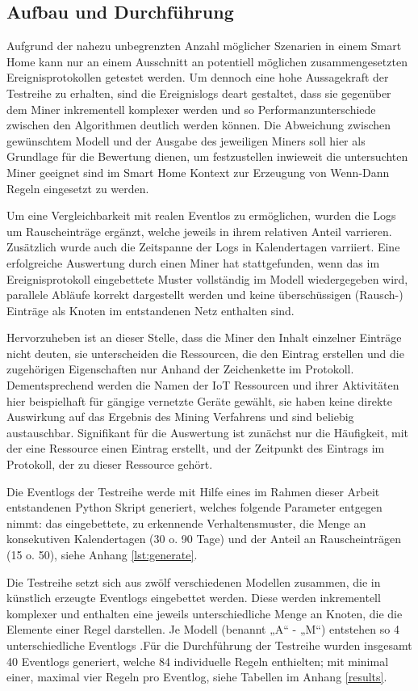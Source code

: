 \subsection{Aufbau und Durchführung}
Aufgrund der nahezu unbegrenzten Anzahl möglicher Szenarien in einem Smart Home kann nur an einem Ausschnitt an potentiell möglichen zusammengesetzten Ereignisprotokollen getestet werden. Um dennoch eine hohe Aussagekraft der Testreihe zu erhalten, sind die Ereignislogs deart gestaltet, dass sie gegenüber dem Miner inkrementell komplexer werden und so Performanzunterschiede zwischen den Algorithmen deutlich werden können. Die Abweichung zwischen gewünschtem Modell und der Ausgabe des jeweiligen Miners soll hier als Grundlage für die Bewertung dienen, um festzustellen inwieweit die untersuchten Miner geeignet sind im Smart Home Kontext zur Erzeugung von Wenn-Dann Regeln eingesetzt zu werden. 

Um eine Vergleichbarkeit mit realen Eventlos zu ermöglichen, wurden die Logs um Rauscheinträge ergänzt, welche jeweils in ihrem relativen Anteil varrieren. Zusätzlich wurde auch die Zeitspanne der Logs in Kalendertagen varriiert. Eine erfolgreiche Auswertung durch einen Miner hat stattgefunden, wenn das im Ereignisprotokoll eingebettete Muster vollständig im Modell wiedergegeben wird, parallele Abläufe korrekt dargestellt werden und keine überschüssigen (Rausch-) Einträge als Knoten im entstandenen Netz enthalten sind.

Hervorzuheben ist an dieser Stelle, dass die Miner den Inhalt einzelner Einträge nicht deuten, sie unterscheiden die Ressourcen, die den Eintrag erstellen und die zugehörigen Eigenschaften nur Anhand der Zeichenkette im Protokoll. Dementsprechend werden die Namen der IoT Ressourcen und ihrer Aktivitäten hier beispielhaft für gängige vernetzte Geräte gewählt, sie haben keine direkte Auswirkung auf das Ergebnis des Mining Verfahrens und sind beliebig austauschbar. Signifikant für die Auswertung ist zunächst nur die Häufigkeit, mit der eine Ressource einen Eintrag erstellt, und der Zeitpunkt des Eintrags im Protokoll, der zu dieser Ressource gehört.

Die Eventlogs der Testreihe werde mit Hilfe eines im Rahmen dieser Arbeit entstandenen Python Skript generiert, welches folgende Parameter entgegen nimmt: das eingebettete, zu erkennende Verhaltensmuster, die Menge an konsekutiven Kalendertagen (30 o. 90 Tage) und der Anteil an Rauscheinträgen (15 o. 50), siehe Anhang \ref{lst:generate}.

Die Testreihe setzt sich aus zwölf verschiedenen Modellen zusammen, die in künstlich erzeugte Eventlogs eingebettet werden. Diese werden inkrementell komplexer und enthalten eine jeweils unterschiedliche Menge an Knoten, die die Elemente einer Regel darstellen. Je Modell (benannt „A“ - „M“) entstehen so 4 unterschiedliche Eventlogs .Für die Durchführung der Testreihe wurden insgesamt 40 Eventlogs generiert, welche 84 individuelle Regeln enthielten; mit minimal einer, maximal vier Regeln pro Eventlog, siehe Tabellen im Anhang \ref{results}. 

